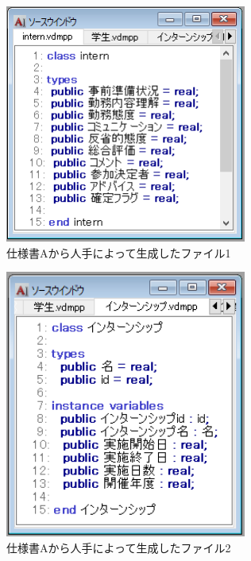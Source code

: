\begin{figure}[tp]
    \begin{center}
    \includegraphics[width=300]{image/speA_vdm1.PNG}
    \caption{仕様書Aから人手によって生成したファイル1}
    \label{fig:speA_vdm1}
    \end{center}
\end{figure}

\begin{figure}[tp]
    \begin{center}
    \includegraphics[width=300]{image/speA_vdm2.PNG}
    \caption{仕様書Aから人手によって生成したファイル2}
    \label{fig:speA_vdm2}
    \end{center}
\end{figure}

